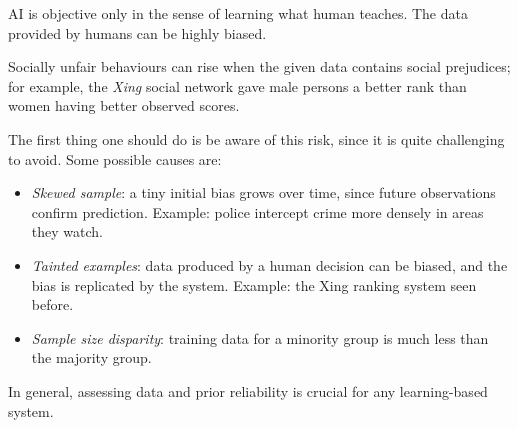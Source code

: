 
AI is objective only in the sense of learning what human teaches. The data provided by humans can be highly biased.

Socially unfair behaviours can rise when the given data contains social prejudices; for example, the \textit{Xing} social network gave male persons a better rank than women having better observed 
scores. 

The first thing one should do is be aware of this risk, since it is quite challenging to avoid. Some possible causes are:

\begin{itemize}
	\item \emph{Skewed sample}: a tiny initial bias grows over time, since future observations confirm prediction. Example: police intercept crime more densely in areas they watch.
	\item \emph{Tainted examples}: data produced by a human decision can be biased, and the bias is replicated by the system. Example: the Xing ranking system seen before.
	\item \emph{Sample size disparity}: training data for a minority group is much less than the majority group.
\end{itemize}

In general, assessing data and prior reliability is crucial for any learning-based system.